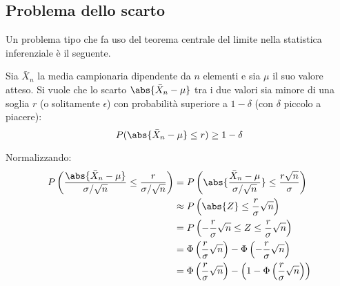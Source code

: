 




\subsection{Problema dello scarto}
Un problema tipo che fa uso del teorema centrale del limite nella statistica inferenziale è il seguente.

Sia $\bar X_n$ la media campionaria dipendente da $n$ elementi e sia $\mu$ il suo valore atteso. Si vuole che lo scarto $\abs{\bar X_n - \mu}$ tra i due valori sia minore di una soglia $r$ (o solitamente $\epsilon$) con probabilità superiore a $1-\delta$ (con $\delta$ piccolo a piacere):
\begin{equation*}
	P(\abs{\bar X_n - \mu} \leq r) \geq 1-\delta \\
\end{equation*}

Normalizzando:
\begin{align*}
	P\left(\frac{\abs{\bar X_n - \mu}}{\sigma/\sqrt{n}} \leq \frac{r}{\sigma/\sqrt{n}}\right) & = P\left(\abs{\frac{\bar X_n - \mu}{\sigma/\sqrt{n}}} \leq \frac{r\sqrt{n}}{\sigma}\right)               \\
	                                                                                          & \approx P\left(\abs{Z} \leq \frac{r}{\sigma}\sqrt{n}\right)                                              \\
	                                                                                          & = P\left(-\frac{r}{\sigma}\sqrt{n}\leq Z\leq \frac{r}{\sigma}\sqrt{n}\right)                             \\
	                                                                                          & = \Phi\left(\frac{r}{\sigma}\sqrt{n}\right) - \Phi\left(- \frac{r}{\sigma}\sqrt{n}\right)                \\
	                                                                                          & = \Phi\left(\frac{r}{\sigma}\sqrt{n}\right) - \left(1 - \Phi\left(\frac{r}{\sigma}\sqrt{n}\right)\right)
\end{align*}


